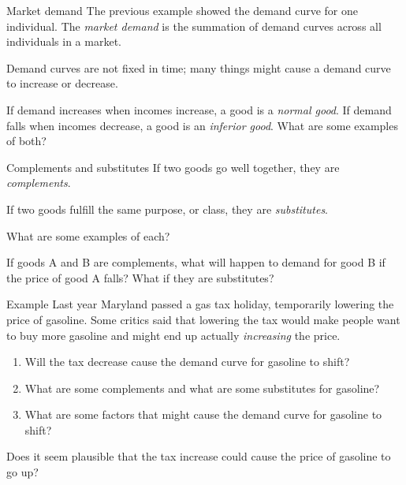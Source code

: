\documentclass[aspectratio=169]{beamer}
\begin{document}
\begin{frame}{Market demand}
    The previous example showed the demand curve for one individual. The \textit{market demand} is the summation of demand curves across all individuals in a market.

    \medskip

    Demand curves are not fixed in time; many things might cause a demand curve to increase or decrease. 

    \medskip

    If demand increases when incomes increase, a good is a \textit{normal good}. If demand falls when incomes decrease, a good is an \textit{inferior good}. What are some examples of both?
\end{frame}

\begin{frame}{Complements and substitutes}
    If two goods go well together, they are \textit{complements}.

    \medskip

    If two goods fulfill the same purpose, or class, they are \textit{substitutes}.

    \medskip

    What are some examples of each?

    \medskip

    If goods A and B are complements, what will happen to demand for good B if the price of good A falls? What if they are substitutes?
\end{frame}

\begin{frame}{Example}
    Last year Maryland passed a gas tax holiday, temporarily lowering the price of gasoline. Some critics said that lowering the tax would make people want to buy more gasoline and might end up actually \textit{increasing} the price.

    \begin{enumerate}
        \item Will the tax decrease cause the demand curve for gasoline to shift?
        \item What are some complements and what are some substitutes for gasoline?
        \item What are some factors that might cause the demand curve for gasoline to shift?
    \end{enumerate}

    Does it seem plausible that the tax increase could cause the price of gasoline to go up?

  \end{frame}
\end{document}
